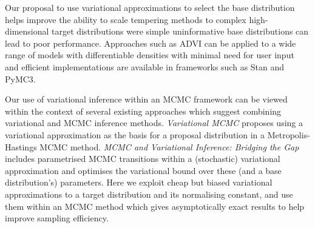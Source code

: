 Our proposal to use variational approximations to select the base distribution helps improve the ability to scale tempering methods to complex high-dimensional target distributions were simple uninformative base distributions can lead to poor performance. Approaches such as \ac{ADVI} \citep{kucukelbir2016automatic} can be applied to a wide range of models with differentiable densities with minimal need for user input and efficient implementations are available in frameworks such as Stan and PyMC3. 

Our use of variational inference  within an \ac{MCMC} framework can be viewed within the context of several existing approaches which suggest combining variational and \ac{MCMC} inference methods. \emph{Variational MCMC} \citep{de2001variational} proposes using a variational approximation as the basis for a proposal distribution in a Metropolis-Hastings \ac{MCMC} method. \emph{MCMC and Variational Inference: Bridging the Gap} \citep{salimans2015markov} includes parametrised \ac{MCMC} transitions within a (stochastic) variational approximation and optimises the variational bound over these (and a base distribution's) parameters. Here we exploit cheap but biased variational approximations to a target distribution and its normalising constant, and use them within an \ac{MCMC} method which gives asymptotically exact results to help improve sampling efficiency.